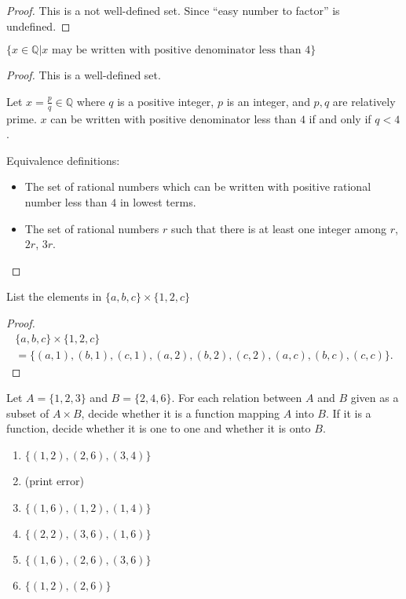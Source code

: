 \begin{proof}
    This is a not well-defined set. Since ``easy number to factor'' is undefined.
\end{proof}

\newpage
\begin{exercise}
    $\{ x\in\mathbb{Q} \vert \text{$x$ may be written with positive denominator less than $4$} \}$
\end{exercise}

\begin{proof}
    This is a well-defined set.

    Let $x = \frac{p}{q}\in\mathbb{Q}$ where $q$ is a positive integer, $p$ is an integer, and $p, q$ are relatively prime. $x$ can be written with positive denominator less than $4$ if and only if $q < 4$.

    Equivalence definitions:
    \begin{itemize}
        \item The set of rational numbers which can be written with positive rational number less than $4$ in lowest terms.
        \item The set of rational numbers $r$ such that there is at least one integer among $r$, $2r$, $3r$.
    \end{itemize}
\end{proof}

\newpage
\begin{exercise}
    List the elements in $\{ a, b, c \} \times \{ 1, 2, c \}$
\end{exercise}

\begin{proof}
    \begin{multline*}
        \{ a, b, c \} \times \{ 1, 2, c \} \\
        = \{ (a, 1), (b, 1), (c, 1), (a, 2), (b, 2), (c, 2), (a, c), (b, c), (c, c) \}.
    \end{multline*}
\end{proof}

\newpage
\begin{exercise}
    Let $A = \{ 1, 2, 3 \}$ and $B = \{ 2, 4, 6 \}$. For each relation between $A$ and $B$ given as a subset of $A\times B$, decide whether it is a function mapping $A$ into $B$. If it is a function, decide whether it is one to one and whether it is onto $B$.
    \begin{enumerate}[label={\textbf{\alph*.}},itemsep=0pt]
        \item $\{ (1, 2), (2, 6), (3, 4) \}$
        \item (print error)
        \item $\{ (1, 6), (1, 2), (1, 4) \}$
        \item $\{ (2, 2), (3, 6), (1, 6) \}$
        \item $\{ (1, 6), (2, 6), (3, 6) \}$
        \item $\{ (1, 2), (2, 6) \}$
    \end{enumerate}
\end{exercise}

